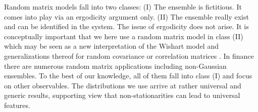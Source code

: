 Random matrix models \cite{random_matrix_1,random_matrix_2} fall into two
classes: (I) The ensemble is fictitious. It comes into play via an ergodicity
argument only. (II) The ensemble really exist and can be identified in the
system. The issue of ergodicity does not arise. It is conceptually important
that we here use a random matrix model in class (II) which may be seen as a new
interpretation of the Wishart model and generalizations thereof for random
covariance or correlation matrices \cite{wishart}. In finance there are numerous
random matrix applications
\cite{matrix_fin_01,matrix_fin_02,matrix_fin_03,matrix_fin_04,matrix_fin_05,matrix_fin_06,matrix_fin_07,matrix_fin_08,matrix_fin_09,matrix_fin_10,matrix_fin_11,matrix_fin_12,matrix_fin_13}
including non-Gaussian ensembles. To the best of our knowledge, all of them
fall into class (I) and focus on other observables. The distributions we use
arrive at rather universal and generic results, supporting view that non-stationarities
can lead to universal features.